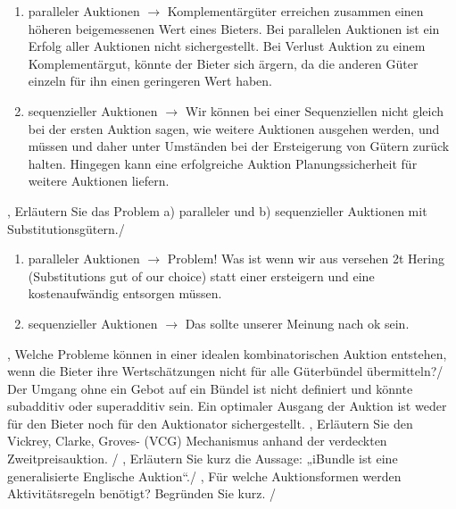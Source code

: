 \documentclass[11pt]{article}
\begin{document}
{{
    \begin{enumerate}
        \item paralleler Auktionen $\to$ Komplementärgüter erreichen zusammen einen höheren beigemessenen Wert eines Bieters. Bei parallelen Auktionen ist ein Erfolg aller Auktionen nicht sichergestellt. Bei Verlust Auktion zu einem Komplementärgut, könnte der Bieter sich ärgern, da die anderen Güter einzeln für ihn einen geringeren Wert haben.
        \item sequenzieller Auktionen $\to$ Wir können bei einer Sequenziellen nicht gleich bei der ersten Auktion sagen, wie weitere Auktionen ausgehen werden, und müssen und daher unter Umständen bei der Ersteigerung von Gütern zurück halten. Hingegen kann eine erfolgreiche Auktion Planungssicherheit für weitere Auktionen liefern.
    \end{enumerate}
},
%
{Erläutern Sie das Problem a) paralleler und b) sequenzieller Auktionen mit Substitutionsgütern.}/
{
    \begin{enumerate}
        \item paralleler Auktionen $\to$ Problem! Was ist wenn wir aus versehen 2t Hering (Substitutions gut of our choice) statt einer ersteigern und eine kostenaufwändig entsorgen müssen.
        \item sequenzieller Auktionen $\to$ Das sollte unserer Meinung nach ok sein.
    \end{enumerate}
},
%
{Welche Probleme können in einer idealen kombinatorischen Auktion entstehen, wenn die Bieter ihre Wertschätzungen nicht für alle Güterbündel übermitteln?}/
{
    Der Umgang ohne ein Gebot auf ein Bündel ist nicht definiert und könnte subadditiv oder superadditiv sein. Ein optimaler Ausgang der Auktion ist weder für den Bieter noch für den Auktionator sichergestellt.
},
%
{Erläutern Sie den Vickrey, Clarke, Groves- (VCG) Mechanismus anhand der verdeckten Zweitpreisauktion.}
/
{
    \todo
},
%
{Erläutern Sie kurz die Aussage: „iBundle ist eine generalisierte Englische Auktion“.}/
{
    \todo
},
%
{Für welche Auktionsformen werden Aktivitätsregeln benötigt? Begründen Sie kurz.}
/
{
    \todo
}
%
%
}


\end{document}
